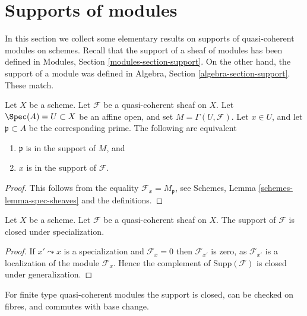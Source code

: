 \section{Supports of modules}
\label{section-support}

\noindent
In this section we collect some elementary results on supports of
quasi-coherent modules on schemes.
Recall that the support of a sheaf of modules has been defined in
Modules, Section \ref{modules-section-support}.
On the other hand, the support of a module was defined in
Algebra, Section \ref{algebra-section-support}.
These match.

\begin{lemma}
\label{lemma-support-affine-open}
Let $X$ be a scheme. Let $\mathcal{F}$ be a quasi-coherent sheaf on $X$.
Let $\Spec(A) = U \subset X$ be an affine open, and set
$M = \Gamma(U, \mathcal{F})$.
Let $x \in U$, and let $\mathfrak p \subset A$ be the corresponding prime.
The following are equivalent
\begin{enumerate}
\item $\mathfrak p$ is in the support of $M$, and
\item $x$ is in the support of $\mathcal{F}$.
\end{enumerate}
\end{lemma}

\begin{proof}
This follows from the equality $\mathcal{F}_x = M_{\mathfrak p}$, see
Schemes, Lemma \ref{schemes-lemma-spec-sheaves}
and the definitions.
\end{proof}

\begin{lemma}
\label{lemma-support-closed-specialization}
Let $X$ be a scheme.
Let $\mathcal{F}$ be a quasi-coherent sheaf on $X$.
The support of $\mathcal{F}$ is closed under specialization.
\end{lemma}

\begin{proof}
If $x' \leadsto x$ is a specialization and $\mathcal{F}_x = 0$
then $\mathcal{F}_{x'}$ is zero, as $\mathcal{F}_{x'}$ is a localization
of the module $\mathcal{F}_x$. Hence the complement of
$\text{Supp}(\mathcal{F})$ is closed under generalization.
\end{proof}

\noindent
For finite type quasi-coherent modules the support is closed,
can be checked on fibres, and commutes with base change.

